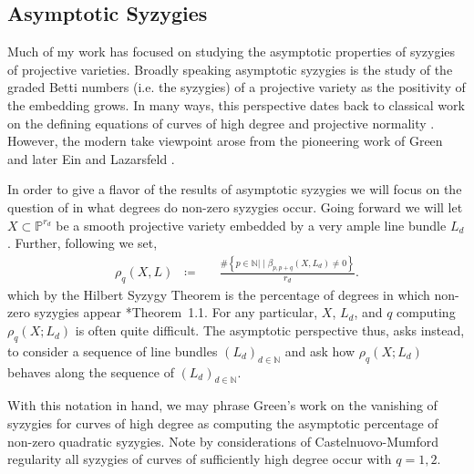 \documentclass[10pt,reqno]{amsart}
\newtheorem{theorem}[lemma]{Theorem}
\theoremstyle{remark}
\newcommand{\N}{\mathbb{N}}
\renewcommand{\P}{\mathbb{P}}
\begin{document}

\subsection{Asymptotic Syzygies}

Much of my work has focused on studying the asymptotic properties of syzygies of projective varieties. Broadly speaking asymptotic syzygies is the study of the graded Betti numbers (i.e. the syzygies) of a projective variety as the positivity of the embedding grows. In many ways, this perspective dates back to classical work on the defining equations of curves of high degree and projective normality \cite{mumford66, mumford70}. However, the modern take viewpoint arose from the pioneering work of Green \cite{green84-I, green84-II} and later Ein and Lazarsfeld \cite{einLazarsfeld12}. 

In order to give a flavor of the results of asymptotic syzygies we will focus on the question of in what degrees do non-zero syzygies occur. Going forward we will let $X\subset \P^{r_{d}}$ be a smooth projective variety embedded by a very ample line bundle $L_{d}$. Further, following \cite{ermanYang18} we set, 
\begin{align*}
\rho_q\left(X,L\right)\;\;\coloneqq&\ \;\; \frac{\#\left\{p\in\N |\; \big| \; \beta_{p,p+q}\left(X,L_{d}\right)\neq0\right\}}{r_{d}}.
\end{align*}
which by the Hilbert Syzygy Theorem is the percentage of degrees in which non-zero syzygies appear \cite{eisenbud05}*{Theorem~1.1}. For any particular, $X$, $L_{d}$, and $q$ computing $\rho_{q}(X;L_{d})$ is often quite difficult. The asymptotic perspective thus, asks instead, to consider a sequence of line bundles $(L_{d})_{d\in \N}$ and ask how $\rho_{q}(X;L_{d})$ behaves along the sequence of $(L_{d})_{d\in \N}$. 

With this notation in hand, we may phrase Green's work on the vanishing of syzygies for curves of high degree as computing the asymptotic percentage of non-zero quadratic syzygies. Note by considerations of Castelnuovo-Mumford regularity all syzygies of curves of sufficiently high degree occur with $q=1,2$.
\end{document}
